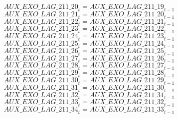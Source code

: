\begin{dmath}
{AUX\_EXO\_LAG\_211\_20}_{t}={AUX\_EXO\_LAG\_211\_19}_{t-1}
\end{dmath}
\begin{dmath}
{AUX\_EXO\_LAG\_211\_21}_{t}={AUX\_EXO\_LAG\_211\_20}_{t-1}
\end{dmath}
\begin{dmath}
{AUX\_EXO\_LAG\_211\_22}_{t}={AUX\_EXO\_LAG\_211\_21}_{t-1}
\end{dmath}
\begin{dmath}
{AUX\_EXO\_LAG\_211\_23}_{t}={AUX\_EXO\_LAG\_211\_22}_{t-1}
\end{dmath}
\begin{dmath}
{AUX\_EXO\_LAG\_211\_24}_{t}={AUX\_EXO\_LAG\_211\_23}_{t-1}
\end{dmath}
\begin{dmath}
{AUX\_EXO\_LAG\_211\_25}_{t}={AUX\_EXO\_LAG\_211\_24}_{t-1}
\end{dmath}
\begin{dmath}
{AUX\_EXO\_LAG\_211\_26}_{t}={AUX\_EXO\_LAG\_211\_25}_{t-1}
\end{dmath}
\begin{dmath}
{AUX\_EXO\_LAG\_211\_27}_{t}={AUX\_EXO\_LAG\_211\_26}_{t-1}
\end{dmath}
\begin{dmath}
{AUX\_EXO\_LAG\_211\_28}_{t}={AUX\_EXO\_LAG\_211\_27}_{t-1}
\end{dmath}
\begin{dmath}
{AUX\_EXO\_LAG\_211\_29}_{t}={AUX\_EXO\_LAG\_211\_28}_{t-1}
\end{dmath}
\begin{dmath}
{AUX\_EXO\_LAG\_211\_30}_{t}={AUX\_EXO\_LAG\_211\_29}_{t-1}
\end{dmath}
\begin{dmath}
{AUX\_EXO\_LAG\_211\_31}_{t}={AUX\_EXO\_LAG\_211\_30}_{t-1}
\end{dmath}
\begin{dmath}
{AUX\_EXO\_LAG\_211\_32}_{t}={AUX\_EXO\_LAG\_211\_31}_{t-1}
\end{dmath}
\begin{dmath}
{AUX\_EXO\_LAG\_211\_33}_{t}={AUX\_EXO\_LAG\_211\_32}_{t-1}
\end{dmath}
\begin{dmath}
{AUX\_EXO\_LAG\_211\_34}_{t}={AUX\_EXO\_LAG\_211\_33}_{t-1}
\end{dmath}
